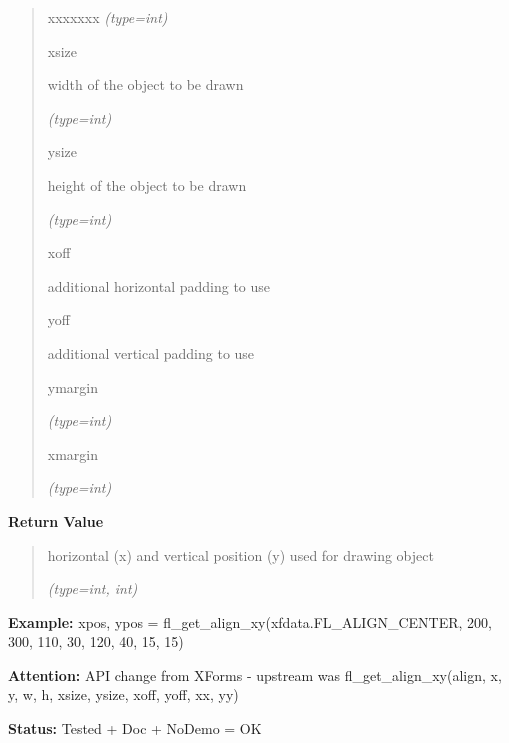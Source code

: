 \begin{boxedminipage}{\funcwidth}
\begin{quote}
\begin{Ventry}{xxxxxxx}
            {\it (type=int)}

          \item[xsize]

          width of the object to be drawn

            {\it (type=int)}

          \item[ysize]

          height of the object to be drawn

            {\it (type=int)}

          \item[xoff]

          additional horizontal padding to use

          \item[yoff]

          additional vertical padding to use

          \item[ymargin]

            {\it (type=int)}

          \item[xmargin]

            {\it (type=int)}

        \end{Ventry}

      \end{quote}

      \textbf{Return Value}
    \vspace{-1ex}

      \begin{quote}
      horizontal (x) and vertical position (y) used for drawing object

      {\it (type=int, int)}

      \end{quote}

\textbf{Example:} xpos, ypos = fl\_get\_align\_xy(xfdata.FL\_ALIGN\_CENTER, 200, 300, 110, 
30, 120, 40, 15, 15)



\textbf{Attention:} API change from XForms - upstream was fl\_get\_align\_xy(align, x, y, w, h,
xsize, ysize, xoff, yoff, xx, yy)



\textbf{Status:} Tested + Doc + NoDemo = OK



    \end{boxedminipage}

